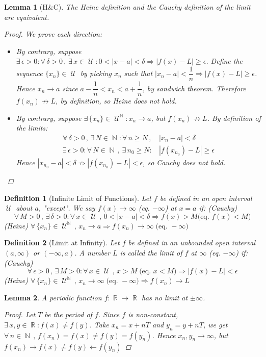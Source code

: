 \documentclass[12pt]{article}
\let\RA\Rightarrow
\let\LA\Leftarrow
\newcommand{\Forall}[1]{\forall\,{#1}\,,\,}
\newcommand{\Exist}[1]{\exists\,{#1}:}
\DeclareMathOperator{\N}{\mathbb{N}}
\DeclareMathOperator{\R}{\mathbb{R}}
\DeclareMathOperator{\U}{\mathcal{U}}
\newtheorem{definition}{Definition}[subsection]
\newtheorem{lemma}{Lemma}[subsection]
\begin{document}
\begin{lemma}[H\&C]
  The Heine definition and the Cauchy definition of the limit are equivalent.
  \begin{proof}
    We prove each direction:
    \begin{itemize}
      \item[$(\RA)$] By contrary, suppose $\Exist{\epsilon>0}\Forall{\delta>0}\Exist{x\in\U}0<|x-a|<\delta\RA |f(x)-L|\geq \epsilon$. Define the sequence $\{x_n\}\in\U$ by picking $x_n$ such that $|x_n-a|<\dfrac{1}{n}\RA |f(x)-L|\geq \epsilon$. Hence $x_n\to a$ since $a-\dfrac{1}{n}<x_n<a+\dfrac{1}{n}$, by sandwich theorem. Therefore $f(x_n)\not\to L$, by definition, so Heine does not hold.
      \item[$(\LA)$] By contrary, suppose $\Exist{\{x_n\}\in\U^{\N}}x_n\to a$, but $f(x_n)\not\to L$. By definition of the limits:
      \begin{align*}
        \Forall{\delta>0}\Exist{N\in\N}\Forall{n\geq N}&|x_n-a|<\delta\\
        \Exist{\epsilon>0}\Forall{N\in\N}\Exist{n_0\geq N}&|f(x_{n_0})-L|\geq \epsilon
      \end{align*}
      Hence $|x_{n_0}-a|<\delta\not\RA|f(x_{n_0})-L|<\epsilon$, so Cauchy does not hold.
    \end{itemize}
  \end{proof}
\end{lemma}

\begin{definition}[Infinite Limit of Functions]
  Let $f$ be defined in an open interval $\U$ about $a$, "except". We say $f(x)\to \infty$ (eq. $-\infty$) at $x=a$ if: (Cauchy) $$\Forall{M>0}\Exist{\delta>0}\Forall{x\in\U}0<|x-a|<\delta\RA f(x)>M \big(\text{eq. }f(x)<M\big)$$
  (Heine) $\Forall{\{x_n\}\in \U^{\N}} x_n\to a \RA f(x_n)\to \infty\;\big(\text{eq. }-\infty\big)$
\end{definition}

\begin{definition}[Limit at Infinity]
  Let $f$ be defined in an unbounded open interval $(a,\infty)$ or $(-\infty,a)$. A number $L$ is called the limit of $f$ at $\infty$ (eq. $-\infty$) if: (Cauchy) $$\Forall{\epsilon>0}\Exist{M>0}\Forall{x\in\U}x>M\;\big(\text{eq. }x<M\big)\RA |f(x)-L|<\epsilon$$
  (Heine) $\Forall{\{x_n\}\in \U^{\N}} x_n\to \infty \;\big(\text{eq. }-\infty\big) \RA f(x_n)\to L$
\end{definition}

\begin{lemma}
  A periodic function $f:\R\to\R$ has no limit at $\pm\infty$.
  \begin{proof}
    Let $T$ be the period of $f$. Since $f$ is non-constant, $\Exist{x,y\in\R}f(x)\neq f(y)$. Take $x_n=x+nT$ and $y_n=y+nT$, we get $\Forall{n\in\N} f(x_n)=f(x)\neq f(y)=f(y_n)$. Hence $x_n,y_n\to\infty$, but $f(x_n)\to f(x)\neq f(y)\leftarrow f(y_n)$
  \end{proof}
\end{lemma}
\end{document}
